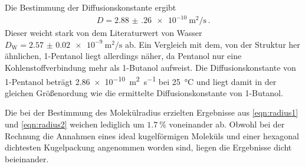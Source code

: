 Die Bestimmung der Diffusionskonstante ergibt
\begin{align*}
  D = \SI{2.88(26)e-10}{\square\meter\per\second}\,.
\end{align*}
Dieser weicht stark von dem Literaturwert von Wasser $D_\text{W} = \SI{2.57(2)e-9}{\square\meter\per\second}$ \cite{wang} ab.
Ein Vergleich mit dem, von der Struktur her ähnlichen, 1-Pentanol liegt allerdings näher, da Pentanol nur eine Kohlenstoffverbindung mehr als 1-Butanol aufweist.
Die Diffusionskonstante von 1-Pentanol beträgt \SI{2.86e-10}{\square\meter\per\second} bei \SI{25}{\degreeCelsius} \cite{Holz} und liegt damit in der gleichen Größenordung wie die ermittelte Diffusionskonstante von 1-Butanol.


Die bei der Bestimmung des Molekülradius erzielten Ergebnisse aus \eqref{eqn:radius1} und \eqref{eqn:radius2} weichen lediglich um $\SI{1.7}{\percent}$ voneinander ab.
Obwohl bei der Rechnung die Annahmen eines ideal kugelförmigen Moleküls und einer hexagonal dichtesten Kugelpackung
angenommen worden sind, liegen die Ergebnisse dicht beieinander.
